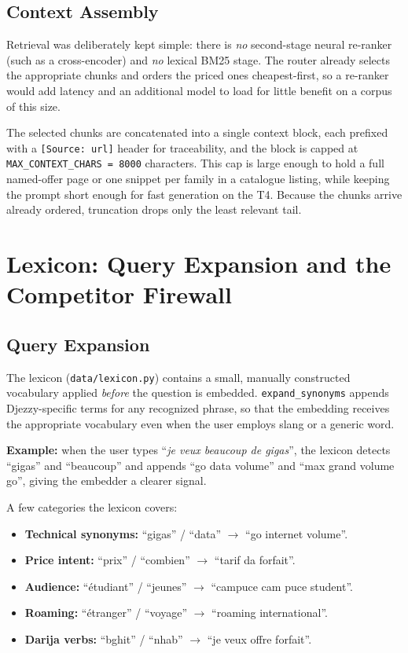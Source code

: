 \documentclass[12pt, a4paper]{report}
\newcommand{\humantext}[1]{#1}      %
\begin{document}
\subsection{Context Assembly}
\humantext{Retrieval was deliberately kept simple: there is \emph{no} second-stage neural re-ranker (such as a cross-encoder) and \emph{no} lexical BM25 stage. The router already selects the appropriate chunks and orders the priced ones cheapest-first, so a re-ranker would add latency and an additional model to load for little benefit on a corpus of this size.}

\humantext{The selected chunks are concatenated into a single context block, each prefixed with a \texttt{[Source: url]} header for traceability, and the block is capped at \texttt{MAX\_CONTEXT\_CHARS = 8000} characters. This cap is large enough to hold a full named-offer page or one snippet per family in a catalogue listing, while keeping the prompt short enough for fast generation on the T4. Because the chunks arrive already ordered, truncation drops only the least relevant tail.}

\section{Lexicon: Query Expansion and the Competitor Firewall}

\subsection{Query Expansion}
\humantext{The lexicon (\texttt{data/lexicon.py}) contains a small, manually constructed vocabulary applied \emph{before} the question is embedded. \texttt{expand\_synonyms} appends Djezzy-specific terms for any recognized phrase, so that the embedding receives the appropriate vocabulary even when the user employs slang or a generic word.}

\humantext{\textbf{Example:} when the user types ``\textit{je veux beaucoup de gigas}'', the lexicon detects ``gigas'' and ``beaucoup'' and appends ``go data volume'' and ``max grand volume go'', giving the embedder a clearer signal.}

\humantext{A few categories the lexicon covers:}
\begin{itemize}[noitemsep]
    \item \humantext{\textbf{Technical synonyms:} ``gigas'' / ``data'' $\rightarrow$ ``go internet volume''.}
    \item \humantext{\textbf{Price intent:} ``prix'' / ``combien'' $\rightarrow$ ``tarif da forfait''.}
    \item \humantext{\textbf{Audience:} ``étudiant'' / ``jeunes'' $\rightarrow$ ``campuce cam puce student''.}
    \item \humantext{\textbf{Roaming:} ``étranger'' / ``voyage'' $\rightarrow$ ``roaming international''.}
    \item \humantext{\textbf{Darija verbs:} ``bghit'' / ``nhab'' $\rightarrow$ ``je veux offre forfait''.}
\end{itemize}
\end{document}
